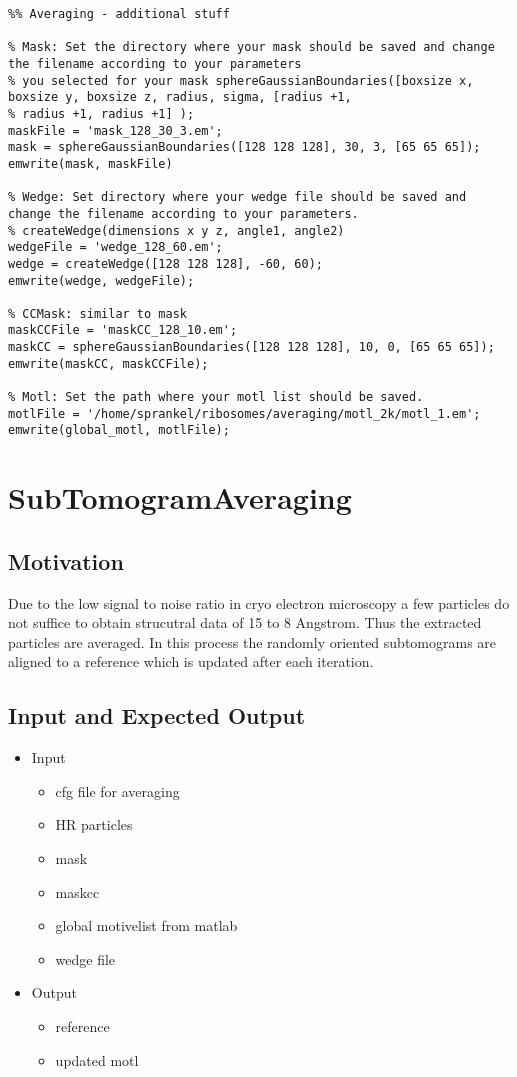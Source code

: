 \documentclass[12pt,a4paper]{scrartcl}
\begin{document}
{\begin{lstlisting}
%% Averaging - additional stuff

% Mask: Set the directory where your mask should be saved and change the filename according to your parameters 
% you selected for your mask sphereGaussianBoundaries([boxsize x, boxsize y, boxsize z, radius, sigma, [radius +1,
% radius +1, radius +1] ); 
maskFile = 'mask_128_30_3.em';
mask = sphereGaussianBoundaries([128 128 128], 30, 3, [65 65 65]);
emwrite(mask, maskFile)

% Wedge: Set directory where your wedge file should be saved and change the filename according to your parameters. 
% createWedge(dimensions x y z, angle1, angle2)
wedgeFile = 'wedge_128_60.em';
wedge = createWedge([128 128 128], -60, 60);
emwrite(wedge, wedgeFile);

% CCMask: similar to mask 
maskCCFile = 'maskCC_128_10.em';
maskCC = sphereGaussianBoundaries([128 128 128], 10, 0, [65 65 65]);
emwrite(maskCC, maskCCFile);

% Motl: Set the path where your motl list should be saved.
motlFile = '/home/sprankel/ribosomes/averaging/motl_2k/motl_1.em';
emwrite(global_motl, motlFile);

\end{lstlisting}

\section{SubTomogramAveraging}
\subsection{Motivation}
Due to the low signal to noise ratio in cryo electron microscopy a few particles do not suffice to obtain strucutral data of 15 to 8 Angstrom. Thus the extracted particles are averaged. In this process the randomly oriented subtomograms are aligned to a reference which is updated after each iteration.  
 
\subsection{Input and Expected Output}
\begin{itemize}
\item Input
\begin{itemize}
\item cfg file for averaging
\item HR particles
\item mask
\item maskcc
\item global motivelist from matlab
\item wedge file  
\end{itemize}
\item Output
\begin{itemize}
\item reference
\item updated motl 
\end{itemize}
\end{itemize}
}
\end{document}
